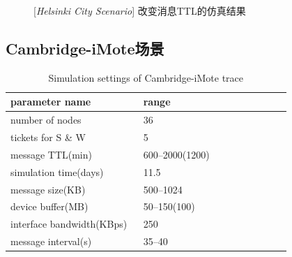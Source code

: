 \begin{figure}[tbp]
\centering
{}
\caption{[\emph{Helsinki City Scenario}] 改变消息TTL的仿真结果}
\label{fig:chap5_helsinki_ttl}
\end{figure}



\subsection{Cambridge-iMote场景}

\begin{table}[tbp]
\centering
\caption{Simulation settings of Cambridge-iMote trace}
\label{tab:chap5_simulation_trace}
\begin{tabular}{
p{0.45\linewidth}<{\centering}
p{0.5\linewidth}<{\centering}
}
\hline
\textbf{parameter name} & \textbf{range} \\
\hline
number of nodes & 36  \\
tickets for S \& W & 5  \\
message TTL(min) & 600--2000(1200) \\
simulation time(days) & 11.5 \\
message size(KB) & 500--1024 \\
device buffer(MB) & 50--150(100) \\
interface bandwidth(KBps) & 250 \\
message interval(s) & 35--40 \\
\hline
\end{tabular}
\end{table}


